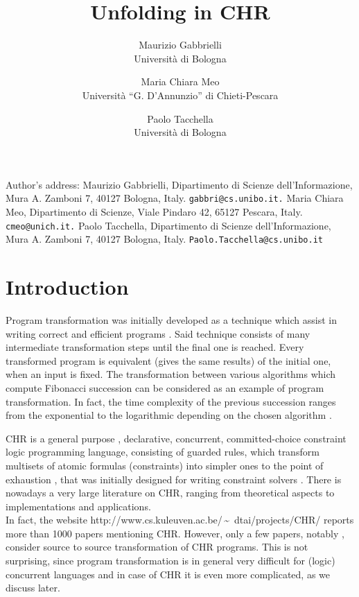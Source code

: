 \documentclass[final]{acmtrans2e}
\title{Unfolding in CHR}
\author{Maurizio Gabbrielli\\
  Universit\`{a} di Bologna
  \and
  Maria Chiara Meo\\
  Universit\`a ``G. D'Annunzio'' di Chieti-Pescara
  \and
  Paolo Tacchella\\
   Universit\`{a} di Bologna}
\begin{document}
            \begin{bottomstuff}
             Author's address:
             \newline
             Maurizio Gabbrielli,
  Dipartimento di Scienze dell'Informazione, Mura A. Zamboni 7, 40127 Bologna, Italy.
  {\tt gabbri@cs.unibo.it.}
  \newline Maria Chiara Meo, Dipartimento di Scienze, Viale Pindaro 42,
  65127 Pescara, Italy.
{\tt cmeo@unich.it.}
 \newline Paolo Tacchella, Dipartimento di Scienze dell'Informazione, Mura A. Zamboni 7, 40127 Bologna, Italy.
{\tt Paolo.Tacchella@cs.unibo.it} \end{bottomstuff}

\maketitle
\section{Introduction}
Program transformation was initially developed as a
technique which assist in writing correct and efficient programs \cite{BD77}.
Said technique consists of many intermediate transformation steps until the final
one is reached. Every transformed program is equivalent (gives the same results) of
the initial one, when an input is fixed. The transformation between various algorithms
which compute Fibonacci succession can be considered as an example of program transformation.
In fact, the time complexity of the previous succession ranges from the exponential to the logarithmic
depending on the chosen  algorithm \cite{SP95}.

CHR is a general purpose \cite{SSD05d}, declarative, concurrent, committed-choice
constraint logic programming language, consisting of guarded rules, which
transform multisets of atomic formulas (constraints) into simpler ones to the point of
exhaustion \cite{Fru06}, that was initially designed for writing
constraint solvers \cite{Fru98,FA03}.
There is nowadays a very  large literature on
CHR, ranging from theoretical aspects to implementations and
applications. \\
In fact, the website
http:/\!/www.cs.kuleuven.ac.be/\,\lower 3.5pt\hbox{\~{}} \,dtai/projects/CHR/
reports more than 1000 papers mentioning CHR. However,
only a few papers, notably \cite{FH03,Fru04,SSD05b}, consider  source
to source transformation of CHR programs. This is not surprising,
since program transformation is in general very difficult for
(logic) concurrent languages and in case of CHR it is even more
complicated, as we discuss later.
\end{document}
